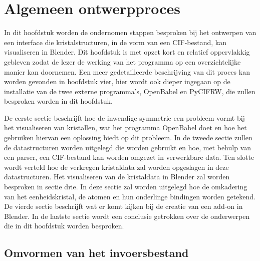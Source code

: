 

\chapter{Algemeen ontwerpproces}

In dit hoofdstuk worden de ondernomen stappen besproken bij het ontwerpen van een interface die kristalstructuren, in de vorm van een CIF-bestand, kan visualiseren in Blender. Dit hoofdstuk is met opzet kort en relatief oppervlakkig gebleven zodat de lezer de werking van het programma op een overzichtelijke manier kan doornemen. Een meer gedetailleerde beschrijving van dit proces kan worden gevonden in hoofdstuk vier, hier wordt ook dieper ingegaan op de installatie van de twee externe programma's, OpenBabel en PyCIFRW, die zullen besproken worden in dit hoofdstuk.
\par
De eerste sectie beschrijft hoe de inwendige symmetrie een probleem vormt bij het visualiseren van kristallen, wat het programma OpenBabel doet en hoe het gebruiken hiervan een oplossing biedt op dit probleem.
In de tweede sectie zullen de datastructuren worden uitgelegd die worden gebruikt en hoe, met behulp van een parser, een CIF-bestand kan worden omgezet in verwerkbare data. Ten slotte wordt verteld hoe de verkregen kristaldata zal worden opgeslagen in deze datastructuren.
Het visualiseren van de kristaldata in Blender zal worden besproken in sectie drie. In deze sectie zal worden uitgelegd hoe de omkadering van het eenheidskristal, de atomen en hun onderlinge bindingen worden getekend.
De vierde sectie beschrijft wat er komt kijken bij de creatie van een add-on in Blender. 
In de laatste sectie wordt een conclusie getrokken over de onderwerpen die in dit hoofdstuk worden besproken.


\section{Omvormen van het invoersbestand}

